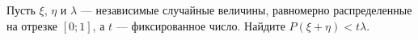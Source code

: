 \documentclass{article}
\begin{document}
Пусть $\xi$, $\eta$ и $\lambda$ --- независимые случайные величины, равномерно распределенные на отрезке $[0;1]$, а $t$ --- фиксированное число. Найдите $P(\xi + \eta) < t\lambda$.
\end{document}
